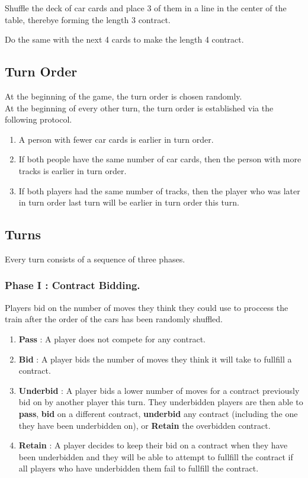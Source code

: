 \documentclass[12pt, letterpaper]{article}
\begin{document}
Shuffle the deck of car cards and place 3 of them in a line in the center of the table, therebye forming the length 3 contract.

Do the same with the next 4 cards to make the length 4 contract.

\subsection{Turn Order}

At the beginning of the game, the turn order is chosen randomly.\\

At the beginning of every other turn, the turn order is established via the following protocol.

\begin{enumerate}
\item A person with fewer car cards is earlier in turn order.
\item If both people have the same number of car cards, then the person with more tracks is earlier in turn order.
\item If both players had the same number of tracks, then the player who was later in turn order last turn will be earlier in turn order this turn.
\end{enumerate}

\subsection{Turns}

Every turn consists of a sequence of three phases.

\subsubsection{Phase I : Contract Bidding.}

Players bid on the number of moves they think they could use to proccess the train after the order of the cars has been randomly shuffled.

\begin{enumerate}
\item \textbf{Pass} : A player does not compete for any contract.
\item \textbf{Bid} : A player bids the number of moves they think it will take to fullfill a contract.
\item \textbf{Underbid} : A player bids a lower number of moves for a contract previously bid on by another player this turn. They underbidden players are then able to \textbf{pass}, \textbf{bid} on a different contract, \textbf{underbid} any contract (including the one they have been underbidden on), or \textbf{Retain} the overbidden contract.
\item \textbf{Retain} : A player decides to keep their bid on a contract when they have been underbidden and they will be able to attempt to fullfill the contract if all players who have underbidden them fail to fullfill the contract.
\end{enumerate}
\end{document}
